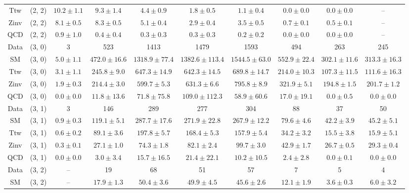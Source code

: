\begin{table}[h!]
{\begin{tabular}{cccccccccc}
	Ttw & (2, 2) & $10.2\pm 1.1$ & $9.3\pm 1.4$ & $4.4\pm 0.9$ & $1.8\pm 0.5$ & $1.1\pm 0.4$ & $0.0\pm 0.0$ & $0.0\pm 0.0$ & -- \\[0.5ex] 
	Zinv & (2, 2) & $8.1\pm 0.5$ & $8.3\pm 0.5$ & $5.1\pm 0.4$ & $2.9\pm 0.4$ & $3.5\pm 0.5$ & $0.7\pm 0.1$ & $0.5\pm 0.1$ & -- \\[0.5ex] 
	QCD & (2, 2) & $0.9\pm 1.0$ & $0.4\pm 0.4$ & $0.3\pm 0.3$ & $0.3\pm 0.3$ & $0.2\pm 0.2$ & $0.0\pm 0.0$ & $0.0\pm 0.0$ & -- \\[0.5ex] 
	Data & (3, 0) & 3 & 523 & 1413 & 1479 & 1593 & 494 & 263 & 245 \\[0.5ex] 
	SM & (3, 0) & $5.0\pm 1.1$ & $472.0\pm 16.6$ & $1318.9\pm 77.4$ & $1382.6\pm 113.4$ & $1544.5\pm 63.0$ & $552.9\pm 22.4$ & $302.1\pm 11.6$ & $313.3\pm 16.3$ \\[0.5ex] 
	Ttw & (3, 0) & $3.1\pm 1.1$ & $245.8\pm 9.0$ & $647.3\pm 14.9$ & $642.3\pm 14.5$ & $689.8\pm 14.7$ & $214.0\pm 10.3$ & $107.3\pm 11.5$ & $111.6\pm 16.3$ \\[0.5ex] 
	Zinv & (3, 0) & $1.9\pm 0.3$ & $214.4\pm 3.0$ & $599.7\pm 5.3$ & $631.3\pm 6.6$ & $795.8\pm 8.9$ & $321.9\pm 5.1$ & $194.8\pm 1.5$ & $201.7\pm 1.2$ \\[0.5ex] 
	QCD & (3, 0) & $0.0\pm 0.0$ & $11.8\pm 13.6$ & $71.8\pm 75.8$ & $109.0\pm 112.3$ & $58.9\pm 60.6$ & $17.0\pm 19.1$ & $0.0\pm 0.5$ & $0.0\pm 0.0$ \\[0.5ex] 
	Data & (3, 1) & 3 & 146 & 289 & 277 & 304 & 88 & 37 & 50 \\[0.5ex] 
	SM & (3, 1) & $0.9\pm 0.3$ & $119.1\pm 5.1$ & $287.7\pm 17.6$ & $271.9\pm 22.8$ & $267.9\pm 12.2$ & $79.6\pm 4.6$ & $42.2\pm 3.9$ & $45.2\pm 5.1$ \\[0.5ex] 
	Ttw & (3, 1) & $0.6\pm 0.2$ & $89.1\pm 3.6$ & $197.8\pm 5.7$ & $168.4\pm 5.3$ & $157.9\pm 5.4$ & $34.2\pm 3.2$ & $15.5\pm 3.8$ & $15.9\pm 5.1$ \\[0.5ex] 
	Zinv & (3, 1) & $0.3\pm 0.1$ & $27.1\pm 1.0$ & $74.3\pm 1.8$ & $82.1\pm 2.4$ & $99.7\pm 3.0$ & $42.9\pm 1.7$ & $26.7\pm 0.5$ & $29.3\pm 0.4$ \\[0.5ex] 
	QCD & (3, 1) & $0.0\pm 0.0$ & $3.0\pm 3.4$ & $15.7\pm 16.5$ & $21.4\pm 22.1$ & $10.2\pm 10.5$ & $2.4\pm 2.8$ & $0.0\pm 0.1$ & $0.0\pm 0.0$ \\[0.5ex] 
	Data & (3, 2) & -- & 19 & 68 & 51 & 57 & 7 & 5 & 4 \\[0.5ex] 
	SM & (3, 2) & -- & $17.9\pm 1.3$ & $50.4\pm 3.6$ & $49.9\pm 4.5$ & $45.6\pm 2.6$ & $12.1\pm 1.9$ & $3.6\pm 0.3$ & $6.0\pm 3.2$ \\[0.5ex] 

\end{tabular}}
\end{table}

